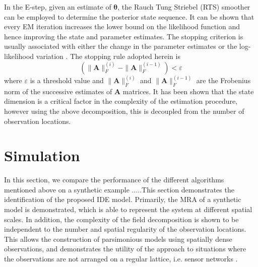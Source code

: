 \documentclass[journal,a4paper]{IEEEtran}
\begin{document}
In the E-step, given an estimate of $\boldsymbol\theta$, the Rauch Tung Striebel (RTS) smoother can be employed to determine the posterior state sequence. It can be shown that \cite{Dempster1977,Gibsona2005} every EM iteration increases the lower bound on the likelihood function and hence improving the state and parameter estimates. The stopping criterion is usually associated  with  either the change in the parameter estimates or the log-likelihood variation \cite{McLachlan1997}. The stopping rule adopted herein is
\begin{equation}
\left(\parallel \mathbf{A} \parallel_{F}^{(i)}-\parallel \mathbf{A} \parallel_{F}^{(i-1)}\right)<\varepsilon 
\end{equation}
where $\varepsilon$ is a threshold value and $\parallel \mathbf{A} \parallel_{F}^{(i)}$ and $ \parallel \mathbf{A} \parallel_{F}^{(i-1)}$ are the Frobenius norm  of the successive estimates of $\mathbf{A} $ matrices. It has been shown \cite{Dewar2009} that the state dimension is a critical factor in the complexity of the estimation procedure, however using the above decomposition, this is decoupled from the number of observation locations.
\section{Simulation}
In this section, we compare the performance of the different algorithms mentioned above on a synthetic example .....This section demonstrates the identification of the proposed IDE model. Primarily, the MRA of a synthetic model is demonstrated, which is able to represent the system at different spatial scales. In addition, the complexity of the field decomposition is shown to be independent to the number and spatial regularity of the observation locations. This allows the construction of parsimonious models using spatially dense observations, and demonstrates the utility of the approach to situations where the observations are not arranged on a regular lattice, i.e. sensor networks \cite{Sahu2008}.
\end{document}
